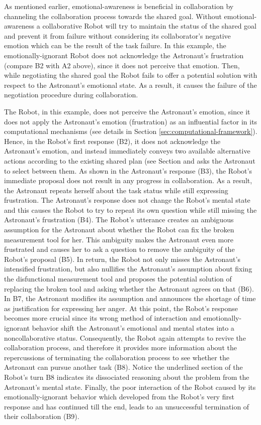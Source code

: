 As mentioned earlier, emotional-awareness is beneficial in collaboration by
channeling the collaboration process towards the shared goal. Without
emotional-awareness a collaborative Robot will try to maintain the status of the
shared goal and prevent it from failure without considering its collaborator's
negative emotion which can be the result of the task failure. In this example,
the emotionally-ignorant Robot does not acknowledge the Astronaut's frustration
(compare B2 with A2 above), since it does not perceive that emotion. Then, while
negotiating the shared goal the Robot fails to offer a potential solution with
respect to the Astronaut's emotional state. As a result, it causes the failure
of the negotiation procedure during collaboration.

The Robot, in this example, does not perceive the Astronaut's emotion, since it
does not apply the Astronaut's emotion (frustration) as an influential factor in
its computational mechanisms (see details in Section
\ref{sec:computational-framework}). Hence, in the Robot's first response (B2),
it does not acknowledge the Astronaut's emotion, and instead immediately conveys
two available alternative actions according to the existing shared plan (see Section
and asks the Astronaut to select between them. As shown in the Astronaut's
response (B3), the Robot's immediate proposal does not result in any progress in
collaboration. As a result, the Astronaut repeats herself about the task status
while still expressing frustration. The Astronaut's response does not change the
Robot's mental state and this causes the Robot to try to repeat its own question
while still missing the Astronaut's frustration (B4). The Robot's utterance
creates an ambiguous assumption for the Astronaut about whether the Robot can
fix the broken measurement tool for her. This ambiguity makes the Astronaut even
more frustrated and causes her to ask a question to remove the ambiguity of the
Robot's proposal (B5). In return, the Robot not only misses the Astronaut's
intensified frustration, but also nullifies the Astronaut's assumption about
fixing the disfunctional measurement tool and proposes the potential solution of
replacing the broken tool and asking whether the Astronaut agrees on that (B6).
In B7, the Astronaut modifies its assumption and announces the shortage of time
as justification for expressing her anger. At this point, the Robot's response
becomes more crucial since its wrong method of interaction and
emotionally-ignorant behavior shift the Astronaut's emotional and mental states
into a noncollaborative status. Consequently, the Robot again attempts to revive
the collaboration process, and therefore it provides more information about the
repercussions of terminating the collaboration process to see whether the
Astronaut can pursue another task (B8). Notice the underlined section of the
Robot's turn B8 indicates its dissociated reasoning about the problem from the
Astronaut's mental state. Finally, the poor interaction of the Robot caused by
its emotionally-ignorant behavior which developed from the Robot's very first
response and has continued till the end, leads to an unsuccessful termination of
their collaboration (B9).\\


